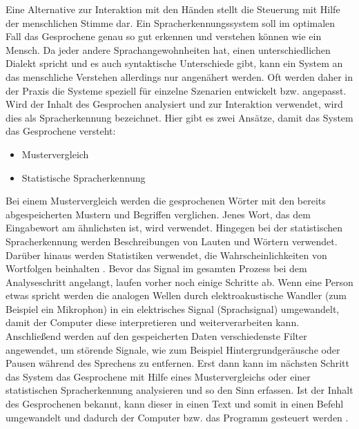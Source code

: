 Eine Alternative zur Interaktion mit den Händen stellt die Steuerung mit Hilfe der menschlichen Stimme dar. Ein Spracherkennungssystem soll im optimalen Fall das Gesprochene genau so gut erkennen und verstehen können wie ein Mensch. Da jeder andere Sprachangewohnheiten hat, einen unterschiedlichen Dialekt spricht und es auch syntaktische Unterschiede gibt, kann ein System an das menschliche Verstehen allerdings nur angenähert werden. Oft werden daher in der Praxis die Systeme speziell für einzelne Szenarien entwickelt bzw. angepasst. 
\newlinew \newline
Wird der Inhalt des Gesprochen analysiert und zur Interaktion verwendet, wird dies als Spracherkennung bezeichnet. Hier gibt es zwei Ansätze, damit das System das Gesprochene versteht:
\begin{itemize}
      \item Mustervergleich
      \item Statistische Spracherkennung
\end{itemize}
\vspace{\baselineskip}
Bei einem Mustervergleich werden die gesprochenen Wörter mit den bereits abgespeicherten Mustern und Begriffen verglichen. Jenes Wort, das dem Eingabewort am ähnlichsten ist, wird verwendet.
Hingegen bei der statistischen Spracherkennung werden Beschreibungen von Lauten und Wörtern verwendet. Darüber hinaus werden Statistiken verwendet, die Wahrscheinlichkeiten von Wortfolgen beinhalten \cite{KaufmannPfisterSprache}.
\newline \newline \newline \newline
Bevor das Signal im gesamten Prozess bei dem Analyseschritt angelangt, laufen vorher noch einige Schritte ab. Wenn eine Person etwas spricht werden die analogen Wellen durch elektroakustische Wandler (zum Beispiel ein Mikrophon) in ein elektrisches Signal (Sprachsignal) umgewandelt, damit der Computer diese interpretieren und weiterverarbeiten kann. Anschließend werden auf den gespeicherten Daten verschiedenste Filter angewendet, um störende Signale, wie zum Beispiel Hintergrundgeräusche oder Pausen während des Sprechens zu entfernen. Erst dann kann im nächsten Schritt das System das Gesprochene mit Hilfe eines Mustervergleichs oder einer statistischen Spracherkennung analysieren und so den Sinn erfassen. Ist der Inhalt des Gesprochenen bekannt, kann dieser in einen Text und somit in einen Befehl umgewandelt und dadurch der Computer bzw. das Programm gesteuert werden \cite{KaufmannPfisterSprache}.
